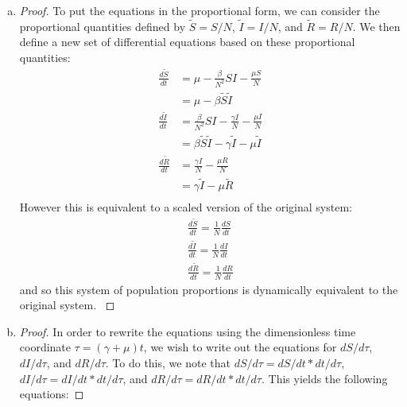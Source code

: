 \documentclass[12pt]{article}\usepackage[]{graphicx}\usepackage[]{color}
\begin{document}
\begin{enumerate}[(a)]
\item \SIRb
{\color{blue}\begin{proof}{\color{magenta}
To put the equations in the proportional form, we can consider the proportional quantities defined by $\tilde{S}=S/N$, $\tilde{I}=I/N$, and $\tilde{R}=R/N$. We then define a new set of differential equations based on these proportional quantities:
\begin{equation}
\begin{aligned}
\frac{d\tilde{S}}{dt} &= \mu - \frac{\beta}{N^2} SI - \frac{\mu S}{N} \\ 
&= \mu -\beta\tilde{S}\tilde{I}\\
\frac{d\tilde{I}}{dt}&=\frac{\beta}{N^2}SI-\frac{\gamma I}{N}-\frac{\mu I}{N} \\
&= \beta \tilde{S}\tilde{I} -\gamma \tilde{I} -\mu \tilde{I}\\
\frac{d\tilde{R}}{dt} &= \frac{\gamma I} {N} - \frac{\mu R }{N} \\
&= \gamma \tilde{I} - \mu \tilde{R} \\
\end{aligned}
\end{equation}
However this is equivalent to a scaled version of the original system:
\begin{equation}
\begin{aligned}
\frac{d\tilde S}{dt} = \frac{1}{N} \frac{dS}{dt} \\
\frac{d\tilde I}{dt} = \frac{1}{N} \frac{dI}{dt} \\
\frac{d\tilde R}{dt} = \frac{1}{N} \frac{dR}{dt}
\end{aligned}
\end{equation}
and so this system of population proportions is dynamically equivalent to the original system. 
}\end{proof}}

\item \SIRc
{\color{blue}\begin{proof}{\color{magenta}
In order to rewrite the equations using the dimensionless time coordinate $\tau=(\gamma + \mu)t$, we wish to write out the equations for $dS/d\tau$, $dI/d\tau$, and $dR/d\tau$. To do this, we note that $dS/d\tau = dS/dt * dt/d\tau$, $dI/d\tau = dI/dt * dt/d\tau$, and $dR/d\tau = dR/dt * dt/d\tau$. This yields the following equations: 

}
\end{proof}}
\end{enumerate}
\end{document}
